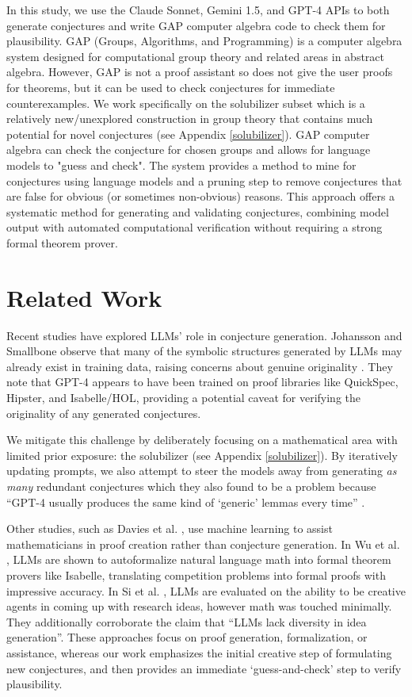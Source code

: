 \documentclass{article}
\begin{document}
In this study, we use the Claude Sonnet, Gemini 1.5, and GPT-4 APIs to both generate conjectures and write GAP computer algebra code to check them for plausibility. GAP (Groups, Algorithms, and Programming) is a computer algebra system designed for computational group theory and related areas in abstract algebra. However, GAP is not a proof assistant so does not give the user proofs for theorems, but it can be used to check conjectures for immediate counterexamples. We work specifically on the solubilizer subset which is a relatively new/unexplored construction in group theory that contains much potential for novel conjectures (see Appendix \ref{solubilizer}). GAP computer algebra can check the conjecture for chosen groups and allows for language models to "guess and check". The system provides a method to mine for conjectures using language models and a pruning step to remove conjectures that are false for obvious (or sometimes non-obvious) reasons. This approach offers a systematic method for generating and validating conjectures, combining model output with automated computational verification without requiring a strong formal theorem prover. 

\section{Related Work} Recent studies have explored LLMs' role in conjecture generation. Johansson and Smallbone observe that many of the symbolic structures generated by LLMs may already exist in training data, raising concerns about genuine originality \cite{JohanssonS23}. They note that GPT-4 appears to have been trained on proof libraries like QuickSpec, Hipster, and Isabelle/HOL, providing a potential caveat for verifying the originality of any generated conjectures. 

We mitigate this challenge by deliberately focusing on a mathematical area with limited prior exposure: the solubilizer (see Appendix \ref{solubilizer}). By iteratively updating prompts, we also attempt to steer the models away from generating \textit{as many} redundant conjectures which they also found to be a problem because ``GPT-4 usually produces the same kind of `generic' lemmas every time'' \cite{JohanssonS23}. 

Other studies, such as Davies et al. \cite{davies2021advancing}, use machine learning to assist mathematicians in proof creation rather than conjecture generation. In Wu et al. \cite{Wu2022AutoformalizationWL}, LLMs are shown to autoformalize natural language math into formal theorem provers like Isabelle, translating competition problems into formal proofs with impressive accuracy. In Si et al. \cite{si2024llmsgeneratenovelresearch}, LLMs are evaluated on the ability to be creative agents in coming up with research ideas, however math was touched minimally. They additionally corroborate the claim that ``LLMs lack diversity in idea generation''\cite{si2024llmsgeneratenovelresearch}. These approaches focus on proof generation, formalization, or assistance, whereas our work emphasizes the initial creative step of formulating new conjectures, and then provides an immediate `guess-and-check' step to verify plausibility.
\end{document}
